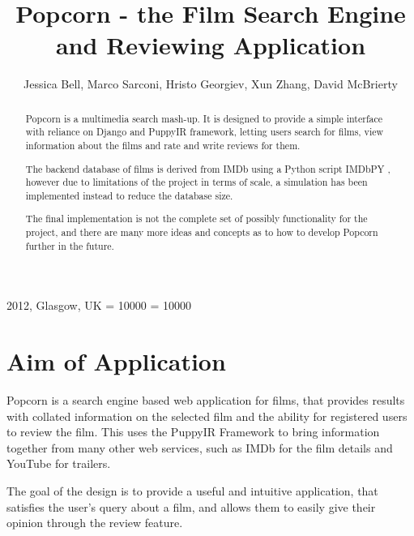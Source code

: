 \documentclass{sig-alt-release2}
\begin{document}
\newcommand{\todo}[1]{\textcolor{red}{#1}}
\def\newblock{\hskip .11em plus .33em minus .07em}

 {2012, Glasgow, UK} 
\clubpenalty = 10000
\widowpenalty = 10000

\title{Popcorn \-- the Film Search Engine and Reviewing Application}

\author{
\alignauthor
Jessica Bell, Marco Sarconi, Hristo Georgiev, Xun Zhang, David McBrierty\\
      \affaddr{}
}
\maketitle

\begin{abstract}
Popcorn is a multimedia search mash-up. It is designed to provide a simple interface with reliance on Django and PuppyIR framework, letting users search for films, view information about the films and rate and write reviews for them.

The backend database of films is derived from IMDb \cite{imdb} using a Python script IMDbPY \cite{imdbpy}, however due to limitations of the project in terms of scale, a simulation has been implemented instead to reduce the database size.

The final implementation is not the complete set of possibly functionality for the project, and there are many more ideas and concepts as to how to develop Popcorn further in the future.

\end{abstract}

\section{Aim of Application}
Popcorn is a search engine based web application for films, that provides results with collated information on the selected film and the ability for registered users to review the film. This uses the PuppyIR Framework \cite{puppyir} to bring information together from many other web services, such as IMDb \cite{imdb} for the film details and YouTube \cite{youtube} for trailers. 
 
The goal of the design is to provide a useful and intuitive application, that satisfies the user's query about a film, and allows them to easily give their opinion through the review feature. 
  
\end{document}
